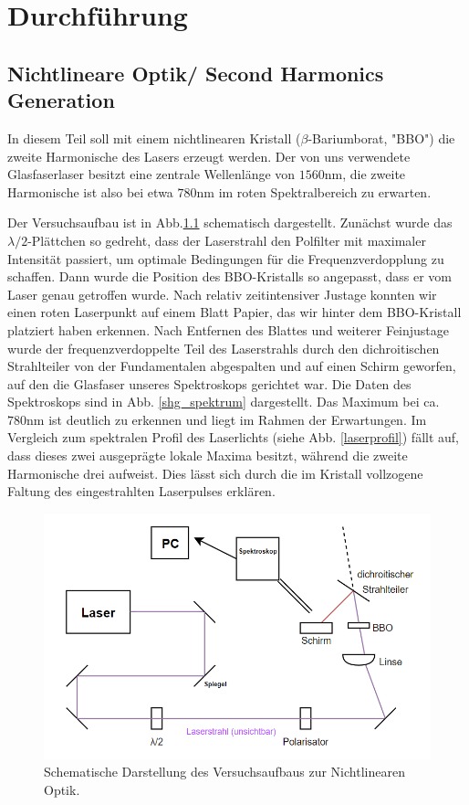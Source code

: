\chapter{Durchführung}

\section{Nichtlineare Optik/ Second Harmonics Generation}
In diesem Teil soll mit einem nichtlinearen Kristall ($\beta$-Bariumborat, "BBO") die zweite Harmonische des Lasers erzeugt werden. Der von uns verwendete Glasfaserlaser besitzt eine zentrale Wellenlänge von $1560\si{\nano\meter}$, die zweite Harmonische ist also bei etwa $780\si{\nano\meter}$ im roten Spektralbereich zu erwarten.
	
Der Versuchsaufbau ist in Abb.\ref{shg_aufbau} schematisch dargestellt.
Zunächst wurde das $\lambda/2$-Plättchen so gedreht, dass der Laserstrahl den Polfilter mit maximaler Intensität passiert, um optimale Bedingungen für die Frequenzverdopplung zu schaffen. Dann wurde die Position des BBO-Kristalls so angepasst, dass er vom Laser genau getroffen wurde. Nach relativ zeitintensiver Justage konnten wir einen roten Laserpunkt auf einem Blatt Papier, das wir hinter dem BBO-Kristall platziert haben erkennen. Nach Entfernen des Blattes und weiterer Feinjustage wurde der frequenzverdoppelte Teil des Laserstrahls durch den dichroitischen Strahlteiler von der Fundamentalen abgespalten und auf einen Schirm geworfen, auf den die Glasfaser unseres Spektroskops gerichtet war. Die Daten des Spektroskops sind in Abb. \ref{shg_spektrum} dargestellt. Das Maximum bei ca. $780\si{\nano\meter}$ ist deutlich zu erkennen und liegt im Rahmen der Erwartungen. Im Vergleich zum spektralen Profil des Laserlichts (siehe Abb. \ref{laserprofil}) fällt auf, dass dieses zwei ausgeprägte lokale Maxima besitzt, während die zweite Harmonische drei aufweist. Dies lässt sich durch die im Kristall vollzogene Faltung des eingestrahlten Laserpulses erklären.


\begin{figure}[H]
	\includegraphics[width=14cm]{Abb/shg_aufbau.png}
	\caption{Schematische Darstellung des Versuchsaufbaus zur Nichtlinearen Optik.}
	\label{shg_aufbau}
\end{figure}
	

